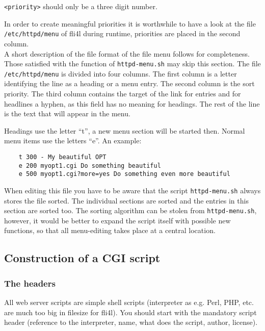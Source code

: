 \texttt{<priority>} should only be a three digit number.

In order to create meaningful priorities it is worthwhile to
have a look at the file\\ \texttt{/etc/httpd/menu} of fli4l during runtime,
priorities are placed in the second column.\\

A short description of the file format of the file menu follows for completeness.
Those satisfied with the function of \texttt{httpd-menu.sh} may skip this
section. The file \texttt{/etc/httpd/menu} is divided into four columns.
The first column is a letter identifying the line as a heading
or a menu entry. The second column is the sort priority. The third column
contains the target of the link for entries and for headlines a hyphen,
as this field has no meaning for headings. The rest of the line is the text
that will appear in the menu.

Headings use the letter ``t'', a new menu section will be started then. Normal
menu items use the letters ``e''.
An example:

\begin{example}
\begin{verbatim}
    t 300 - My beautiful OPT
    e 200 myopt1.cgi Do something beautiful
    e 500 myopt1.cgi?more=yes Do something even more beautiful
\end{verbatim}
\end{example}

When editing this file you have to be aware that the script \texttt{httpd-menu.sh} 
always stores the file sorted. The individual
sections are sorted and the entries in this section are sorted too.
The sorting algorithm can be stolen from \texttt{httpd-menu.sh}, however,
it would be better to expand the script itself with possible new
functions, so that all menu-editing takes place at a central location.

\subsection{Construction of a CGI script}

\subsubsection{The headers}
All web server scripts are simple shell scripts (interpreter as e.g.
Perl, PHP, etc. are much too big in filesize for fli4l). You should start with the
mandatory script header (reference to the interpreter, name, what does the script,
author, license).

